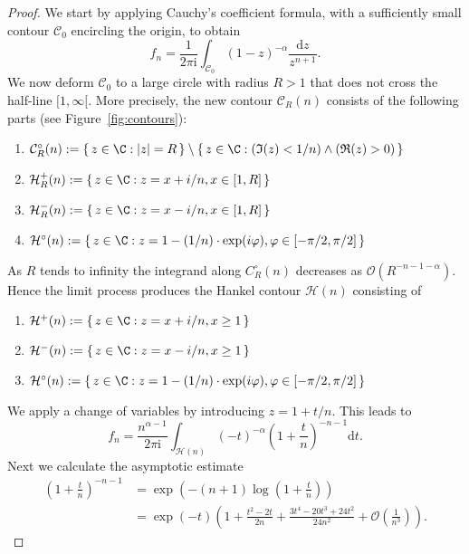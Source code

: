 \begin{proof}
  We start by applying Cauchy's coefficient formula, with a sufficiently small contour $\mathcal{C}_0$ encircling the origin, to obtain
  $$
    f_{n} = \frac{1}{2\pi \mathrm{i}}\int_{\mathcal{C}_{0}}(1-z)^{-\alpha} \frac{\mathrm{d}z}{z^{n+1}}.
  $$
  We now deform $\mathcal{C}_0$ to a large circle with radius $R > 1$ that does not cross the half-line $[1,\infty[$.
  More precisely, the new contour $\mathcal{C}_{R}(n)$ consists of the following parts (see Figure~\ref{fig:contours}):
  \begin{enumerate}
    \item $\mathcal{C}_{R}^{\circ}(n) := \{\, z \in \C: |z| = R \,\} \setminus \{\, z \in \C: (\mathfrak{I}(z) < 1/n) \land (\mathfrak{R}(z) > 0) \,\}$
    \item $\mathcal{H}_R^{+}(n) := \{\, z \in \C: z = x + i/n, x \in [1,R] \,\}$
    \item $\mathcal{H}_R^{-}(n) := \{\, z \in \C: z = x - i/n, x \in [1,R] \,\}$
    \item $\mathcal{H}^{\circ}(n) := \{\, z \in \C: z = 1 - (1/n) \cdot \exp(i\varphi), \varphi \in [-\pi/2,\pi/2]\,\}$
  \end{enumerate}
  As $R$ tends to infinity the integrand along $C_{R}^{\circ}(n)$ decreases as $\mathcal{O}(R^{-n-1-\alpha})$.
  Hence the limit process produces the Hankel contour $\mathcal{H}(n)$ consisting of
  \begin{enumerate}
    \item $\mathcal{H}^{+}(n) := \{\, z \in \C: z = x + i/n, x \geq 1 \,\}$
    \item $\mathcal{H}^{-}(n) := \{\, z \in \C: z = x - i/n, x \geq 1 \,\}$
    \item $\mathcal{H}^{\circ}(n) := \{\, z \in \C: z = 1 - (1/n) \cdot \exp(i\varphi), \varphi \in [-\pi/2,\pi/2] \,\}$
  \end{enumerate}
  We apply a change of variables by introducing $z = 1 + t/n$. This leads to 
  $$
    f_{n} = \frac{n^{\alpha-1}}{2\pi \mathrm{i}}\int_{\mathcal{H}(n)} (-t)^{-\alpha}\left(1 + \frac{t}{n}\right)^{-n-1}\mathrm{d}t.
  $$
  Next we calculate the asymptotic estimate
  \begin{equation}\label{eq:asymptotic_expansion}
    \begin{split}
      \left(1+\frac{t}{n}\right)^{-n-1} 
      &= \exp\left(-(n+1)\log\left(1 + \frac{t}{n}\right)\right) \\ 
      &= \exp(-t)\left(1 + \frac{t^{2} - 2t}{2n} + \frac{3t^{4} - 20t^{3} + 24t^{2}}{24n^{2}} +  \mathcal{O}\left(\frac{1}{n^{3}}\right)\right).

\end{split}
\end{equation}
\end{proof}
